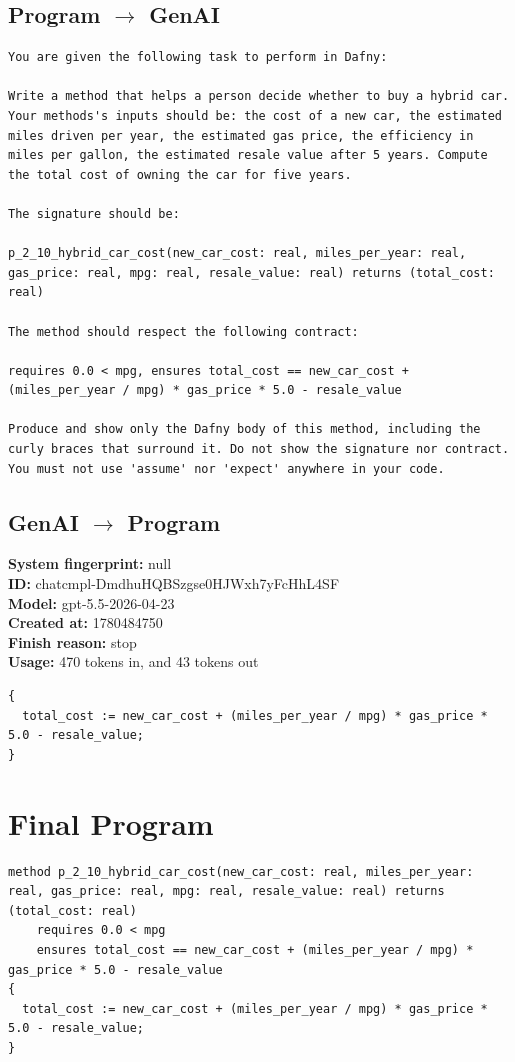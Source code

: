 \documentclass{article}
\begin{document}
\subsection*{Program $\rightarrow$ GenAI}
\begin{lstlisting}
You are given the following task to perform in Dafny:

Write a method that helps a person decide whether to buy a hybrid car. Your methods's inputs should be: the cost of a new car, the estimated miles driven per year, the estimated gas price, the efficiency in miles per gallon, the estimated resale value after 5 years. Compute the total cost of owning the car for five years.

The signature should be:

p_2_10_hybrid_car_cost(new_car_cost: real, miles_per_year: real, gas_price: real, mpg: real, resale_value: real) returns (total_cost: real)

The method should respect the following contract:

requires 0.0 < mpg, ensures total_cost == new_car_cost + (miles_per_year / mpg) * gas_price * 5.0 - resale_value

Produce and show only the Dafny body of this method, including the curly braces that surround it. Do not show the signature nor contract. You must not use 'assume' nor 'expect' anywhere in your code.
\end{lstlisting}
\subsection*{GenAI $\rightarrow$ Program}
\textbf{System fingerprint: }null
\\\textbf{ID: }chatcmpl-DmdhuHQBSzgse0HJWxh7yFcHhL4SF
\\\textbf{Model: }gpt-5.5-2026-04-23
\\\textbf{Created at: }1780484750
\\\textbf{Finish reason: }stop
\\\textbf{Usage: }470 tokens in, and 43 tokens out
\begin{lstlisting}
{
  total_cost := new_car_cost + (miles_per_year / mpg) * gas_price * 5.0 - resale_value;
}
\end{lstlisting}
\section*{Final Program}
\begin{lstlisting}
method p_2_10_hybrid_car_cost(new_car_cost: real, miles_per_year: real, gas_price: real, mpg: real, resale_value: real) returns (total_cost: real)
	requires 0.0 < mpg
	ensures total_cost == new_car_cost + (miles_per_year / mpg) * gas_price * 5.0 - resale_value
{
  total_cost := new_car_cost + (miles_per_year / mpg) * gas_price * 5.0 - resale_value;
}
\end{lstlisting}
\end{document}
